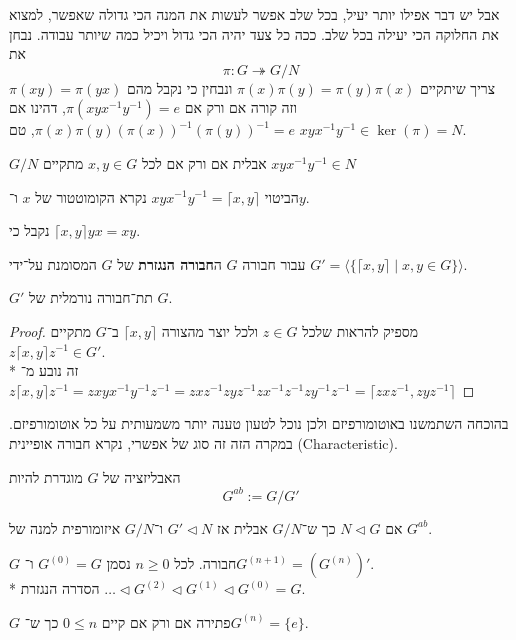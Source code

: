 אבל יש דבר אפילו יותר יעיל, בכל שלב אפשר לעשות את המנה הכי גדולה שאפשר, למצוא את החלוקה הכי יעילה בכל שלב.
ככה כל צעד יהיה הכי גדול ויכיל כמה שיותר עבודה. נבחן את
\[
	\pi : G \twoheadrightarrow G / N
\]
צריך שיתקיים $\pi(x) \pi(y) = \pi(y) \pi(x)$ ונבחין כי נקבל מהם $\pi(xy) = \pi(yx)$ וזה קורה אם ורק אם $\pi(xyx^{-1}y^{-1}) = e$, דהינו אם $\pi(x) \pi(y) {(\pi(x))}^{-1} {(\pi(y))}^{-1} = e$,
טם $x y x^{-1} y^{-1} \in \ker(\pi) = N$.
\begin{conclusion}
	$G/N$ אבלית אם ורק אם לכל $x, y \in G$ מתקיים $xyx^{-1} y^{-1} \in N$
\end{conclusion}
\begin{definition}[קומוטטור]
	הביטוי $xyx^{-1}y^{-1} = \lceil x, y \rceil$ נקרא הקומוטטור של $x$ ו־$y$.
\end{definition}
נקבל כי $\lceil x, y \rceil yx = xy$.
\begin{definition}
	עבור חבורה $G$ ה\textbf{חבורה הנגזרת} של $G$ המסומנת על־ידי $G' = \langle \{ \lceil x, y \rceil \mid x, y \in G \} \rangle$.
\end{definition}
\begin{proposition}
	$G'$ תת־חבורה נורמלית של $G$.
\end{proposition}
\begin{proof}
	מספיק להראות שלכל $z \in G$ ולכל יוצר מהצורה $\lceil x, y \rceil$ ב־$G$ מתקיים $z \lceil x, y \rceil z^{-1} \in G'$. \\*
	זה נובע מ־$z \lceil x, y \rceil z^{-1} = z xy x^{-1} y^{-1} z^{-1} = z x z^{-1} z y z ^{-1} z x^{-1} z^{-1} z y^{-1} z^{-1} = \lceil zxz^{-1}, zyz^{-1} \rceil$
\end{proof}
בהוכחה השתמשנו באוטומורפיזם ולכן נוכל לטעון טענה יותר משמעותית על כל אוטומורפיזם. במקרה הזה זה סוג של אפשרי, נקרא חבורה אופיינית (Characteristic).
\begin{definition}[אבליזציה]
	האבליזציה של $G$ מוגדרת להיות
	\[
		G^{ab} := G / G'
	\]
\end{definition}
\begin{remark}
	 אם $N \triangleleft G$ כך ש־$G / N$ אבלית אז $G' \triangleleft N$ ו־$G / N$ איזומורפית למנה של $G^{ab}$.
\end{remark}
\begin{definition}
	$G$ חבורה. לכל $n \ge 0$ נסמן $G^{(0)} = G$ ו־$G^{(n + 1)} = (G^{(n)})'$. \\*
	הסדרה הנגזרת $\dots \triangleleft G^{(2)} \triangleleft G^{(1)} \triangleleft G^{(0)} = G$.
\end{definition}
\begin{proposition}
	$G$ פתירה אם ורק אם קיים $0 \le n$ כך ש־$G^{(n)} = \{e\}$.
\end{proposition}
